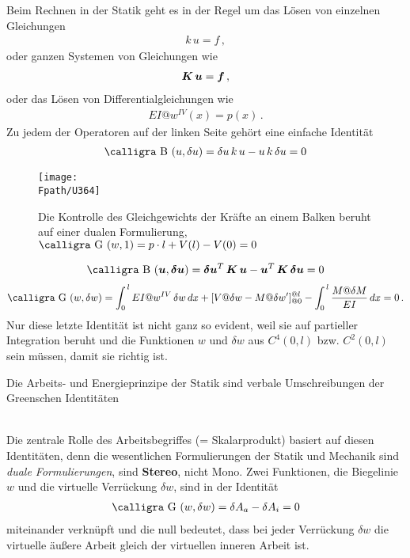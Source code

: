 {{{Beim Rechnen in der Statik geht es in der Regel um das L\"{o}sen von einzelnen Gleichungen
\begin{align}
k\,u = f\,,
\end{align}
oder ganzen Systemen von Gleichungen wie
\begin{align}
\mbox{\boldmath $K$}\,\mbox{\boldmath $u$} = \mbox{\boldmath $f$}\,,
\end{align}
oder das L\"{o}sen von Differentialgleichungen wie
\begin{align}
EI@w^{IV}(x) = p(x)\,.
\end{align}
Zu jedem der Operatoren auf der linken Seite geh\"{o}rt eine einfache Identit\"{a}t
\begin{align}
\text{\normalfont\calligra B\,\,}(u,\delta u) = \delta u\,k\,u - u\,k\,\delta u = 0
\end{align}
\begin{figure}[tbp]
\centering
\if {} \sidecaption \fi
\texttt{[image: \\Fpath/U364]}
\caption{Die Kontrolle des Gleichgewichts der Kr\"{a}fte an einem Balken beruht auf einer dualen Formulierung, $\text{\normalfont\calligra G\,\,}(w,1) = p \cdot l + V(l) - V(0) = 0$} \label{U364}%
\end{figure}%
\begin{align}
\text{\normalfont\calligra B\,\,}(\vek u,\vek \delta \vek u) = \vek \delta \vek u^T\,\vek K\,\vek u - \vek u^T\,\vek K\,\vek \delta \vek u = 0
\end{align}
\begin{align}\label{Eq55}
\text{\normalfont\calligra G\,\,}(w,\delta w) = \int_0^{\,l} EI@w^{IV}\,\delta w\,dx + [V@\delta w - M@\delta w']_{@0}^{@l} - \int_0^{\,l} \frac{M@\delta M}{EI}\,dx = 0\,.
\end{align}
Nur diese letzte Identit\"{a}t ist nicht ganz so evident, weil sie auf partieller Integration beruht und die Funktionen $w$ und $\delta w$ aus $C^4(0,l)$ bzw. $C^2(0,l)$ sein m\"{u}ssen, damit sie richtig ist.\\

\hspace*{-12pt}\colorbox{highlightBlue}{\parbox{0.98\textwidth}{ Die Arbeits- und Energieprinzipe der Statik sind verbale Umschreibungen der Greenschen Identit\"{a}ten}}\\

Die zentrale Rolle des Arbeitsbegriffes (= Skalarprodukt) basiert auf diesen Identit\"{a}ten, denn die wesentlichen Formulierungen der Statik und Mechanik sind {\em duale Formulierungen\/}, sind {\bf \glq Stereo\grq{}}, nicht \glq  Mono\grq{}. Zwei Funktionen, die Biegelinie $w$ und die virtuelle Verr\"{u}ckung $\delta w$, sind in der Identit\"{a}t
\begin{align}\label{Eq182}
\text{\normalfont\calligra G\,\,}(w,\delta w) =  \delta A_a - \delta A_i = 0
\end{align}
miteinander verkn\"{u}pft und die null bedeutet, dass bei jeder Verr\"{u}ckung $\delta w $ die virtuelle \"{a}u{\ss}ere Arbeit gleich der virtuellen inneren Arbeit ist.

}}}
